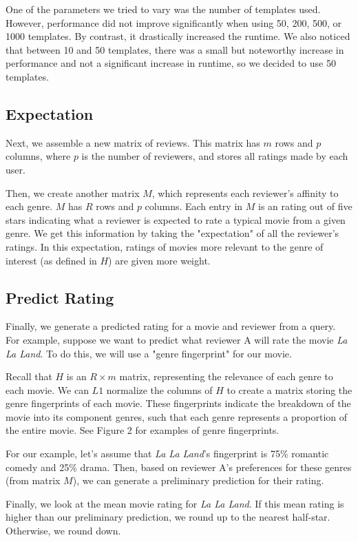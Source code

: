 \documentclass[letterpaper, 10 pt, conference]{ieeeconf}  %
\begin{document}
One of the parameters we tried to vary was the number of templates used. However, performance did not improve significantly when using 50, 200, 500, or 1000 templates. By contrast, it drastically increased the runtime. We also noticed that between 10 and 50 templates, there was a small but noteworthy increase in performance and not a significant increase in runtime, so we decided to use 50 templates.

\subsection{Expectation}

Next, we assemble a new matrix of reviews. This matrix has $m$ rows and $p$ columns, where $p$ is the number of reviewers, and stores all ratings made by each user.

Then, we create another matrix $M$, which represents each reviewer's affinity to each genre. 
$M$ has $R$ rows and $p$ columns. Each entry in $M$ is an rating out of five stars indicating what a reviewer is expected to rate a typical movie from a given genre.
We get this information by taking the "expectation" of all the reviewer's ratings. In this expectation, ratings of movies more relevant to the genre of interest (as defined in $H$) are given more weight.

\subsection{Predict Rating}
Finally, we generate a predicted rating for a movie and reviewer from a query. For example, suppose we want to predict what reviewer A will rate the movie \textit{La La Land}. To do this, we will use a "genre fingerprint" for our movie.

Recall that $H$ is an $R \times m$ matrix, representing the relevance of each genre to each movie. We can $L1$ normalize the columns of $H$ to create a matrix storing the genre fingerprints of each movie.
These fingerprints indicate the breakdown of the movie into its component genres, such that each genre represents a proportion of the entire movie. See Figure 2 for examples of genre fingerprints.

For our example, let's assume that \textit{La La Land}'s fingerprint is 75\% romantic comedy and 25\% drama. Then, based on reviewer A's preferences for these genres (from matrix $M$), we can generate a preliminary prediction for their rating.

Finally, we look at the mean movie rating for \textit{La La Land}. If this mean rating is higher than our preliminary prediction, we round up to the nearest half-star. Otherwise, we round down.
\end{document}
